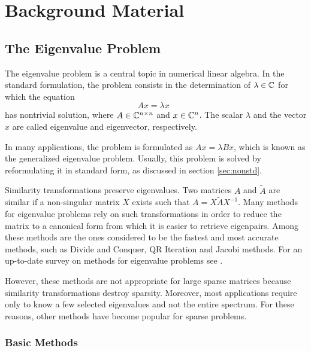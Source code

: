 \chapter{\label{cap:back}Background Material}

\section{The Eigenvalue Problem}
\label{sec:eig}

	The eigenvalue problem is a central topic in numerical linear algebra. In the standard formulation, the problem consists in the determination of $\lambda\in\mathbb{C}$ for which the equation
\begin{equation}Ax=\lambda x\;\;\label{eq:eigstd}\end{equation}
has nontrivial solution, where $A\in\mathbb{C}^{n\times n}$ and $x \in \mathbb{C}^n$. The scalar $\lambda$ and the vector $x$ are called eigenvalue and eigenvector, respectively.

	In many applications, the problem is formulated as $Ax=\lambda Bx$, which is known as the generalized eigenvalue problem. Usually, this problem is solved by reformulating it in standard form, as discussed in section \ref{sec:nonstd}.

	Similarity transformations preserve eigenvalues. Two matrices $A$ and $\tilde{A}$ are similar if a non-singular matrix $X$ exists such that $A=X\tilde{A}X^{-1}$. Many methods for eigenvalue problems rely on such transformations in order to reduce the matrix to a canonical form from which it is easier to retrieve eigenpairs. Among these methods are the ones considered to be the fastest and most accurate methods, such as Divide and Conquer, QR Iteration and Jacobi methods. For an up-to-date survey on methods for eigenvalue problems see \citep{Golub:2000:EC2}.

	However, these methods are not appropriate for large sparse matrices because similarity transformations destroy sparsity. Moreover, most applications require only to know a few selected eigenvalues and not the entire spectrum. For these reasons, other methods have become popular for sparse problems. 

\subsection{Basic Methods}

